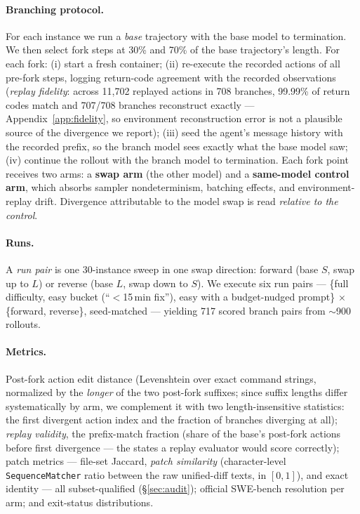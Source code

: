 \documentclass{article}
\begin{document}
\paragraph{Branching protocol.} For each instance we run a \emph{base} trajectory with the base model to termination. We then select fork steps at 30\% and 70\% of the base trajectory's length. For each fork: (i) start a fresh container; (ii) re-execute the recorded actions of all pre-fork steps, logging return-code agreement with the recorded observations (\emph{replay fidelity}: across 11{,}702 replayed actions in 708 branches, 99.99\% of return codes match and 707/708 branches reconstruct exactly --- Appendix~\ref{app:fidelity}, so environment reconstruction error is not a plausible source of the divergence we report); (iii) seed the agent's message history with the recorded prefix, so the branch model sees exactly what the base model saw; (iv) continue the rollout with the branch model to termination. Each fork point receives two arms: a \textbf{swap arm} (the other model) and a \textbf{same-model control arm}, which absorbs sampler nondeterminism, batching effects, and environment-replay drift. Divergence attributable to the model swap is read \emph{relative to the control}.

\paragraph{Runs.} A \emph{run pair} is one 30-instance sweep in one swap direction: forward (base $S$, swap up to $L$) or reverse (base $L$, swap down to $S$). We execute six run pairs --- \{full difficulty, easy bucket (``$<$15\,min fix''), easy with a budget-nudged prompt\} $\times$ \{forward, reverse\}, seed-matched --- yielding 717 scored branch pairs from $\sim$900 rollouts.

\paragraph{Metrics.} Post-fork action edit distance (Levenshtein over exact command strings, normalized by the \emph{longer} of the two post-fork suffixes; since suffix lengths differ systematically by arm, we complement it with two length-insensitive statistics: the first divergent action index and the fraction of branches diverging at all); \emph{replay validity}, the prefix-match fraction (share of the base's post-fork actions before first divergence --- the states a replay evaluator would score correctly); patch metrics --- file-set Jaccard, \emph{patch similarity} (character-level \texttt{SequenceMatcher} ratio between the raw unified-diff texts, in $[0,1]$), and exact identity --- all subset-qualified (\S\ref{sec:audit}); official SWE-bench resolution per arm; and exit-status distributions.
\end{document}
